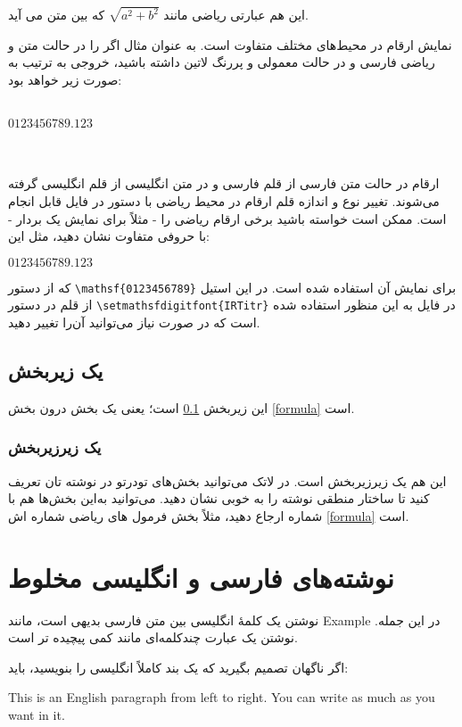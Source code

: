 این هم عبارتی ریاضی مانند 
$\sqrt{a^2+b^2}$
 که بین متن می آید.

نمایش ارقام در محیط‌های مختلف متفاوت است. به عنوان مثال اگر  را  در حالت متن و ریاضی فارسی و در حالت معمولی و پررنگ لاتین داشته باشید، خروجی به ترتیب به صورت زیر خواهد بود:
 \begin{LTR}
 \\
 $0123456789.123$\\
 \\
\\
\end{LTR}
 ارقام در حالت متن فارسی از قلم فارسی و در متن انگلیسی از قلم انگلیسی گرفته می‌شوند. تغییر نوع و اندازه قلم ارقام در محیط ریاضی با دستور 
در فایل 
قابل انجام است. 
   ممکن است خواسته باشید برخی ارقام ریاضی را - مثلاً برای نمایش یک بردار - با حروفی متفاوت نشان دهید، مثل این: 
\begin{LTR}
 \noindent
$\mathsf{0123456789.123}$ 
\end{LTR}


که از دستور 
\verb!\mathsf{0123456789}!
برای نمایش آن استفاده شده است. در این استیل از قلم 
در دستور
\verb!\setmathsfdigitfont{IRTitr}!
در فایل 
به این منظور استفاده شده است که در صورت نیاز می‌توانید آن‌را تغییر دهید.

\subsection{یک زیربخش}\label{zirbakhsh}

این زیربخش \ref{zirbakhsh} است؛ یعنی یک بخش درون بخش \ref{formula} است.
\subsubsection{یک زیرزیربخش}
این هم یک زیرزیربخش است. در لاتک می‌توانید بخش‌های تودرتو در نوشته تان تعریف کنید تا ساختار منطقی نوشته را به خوبی نشان دهید. می‌توانید به‌این بخش‌ها هم با شماره ارجاع دهید، مثلاً بخش فرمول های ریاضی شماره اش \ref{formula} است.
\section{نوشته‌های فارسی و انگلیسی مخلوط}
نوشتن یک کلمهٔ انگلیسی بین متن فارسی بدیهی است، مانند Example در این جمله.
نوشتن یک عبارت چندکلمه‌ای مانند
  کمی پیچیده تر است.

اگر ناگهان تصمیم بگیرید که یک بند کاملاً انگلیسی را بنویسید، باید:
\begin{latin}
This is an English paragraph from left to right. You can write as much as you want in it.
\end{latin}
